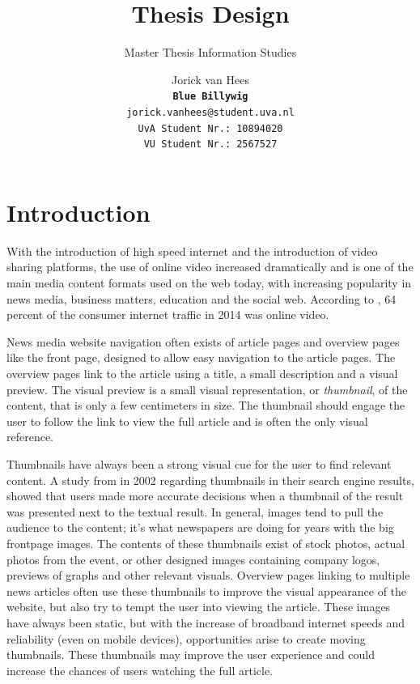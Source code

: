 \documentclass{../resources/acm_proc_article-sp}
\begin{document}
\title{Thesis Design}
\subtitle{Master Thesis Information Studies}

\author{
Jorick van Hees \\
\texttt{\textbf{Blue Billywig}} \\
\texttt{jorick.vanhees@student.uva.nl} \\
\texttt{UvA Student Nr.: 10894020} \\
\texttt{VU Student Nr.: 2567527}
}

\maketitle


\section{Introduction}

With the introduction of high speed internet and the introduction of video sharing platforms, the use of online video increased dramatically and is one of the main media content formats used on the web today, with increasing popularity in news media, business matters, education and the social web. According to \textcite{Cisco:2015wm}, 64 percent of the consumer internet traffic in 2014 was online video.

News media website navigation often exists of article pages and overview pages like the front page, designed to allow easy navigation to the article pages. The overview pages link to the article using a title, a small description and a visual preview. The visual preview is a small visual representation, or \textit{thumbnail}, of the content, that is only a few centimeters in size. The thumbnail should engage the user to follow the link to view the full article and is often the only visual reference.

Thumbnails have always been a strong visual cue for the user to find relevant content. A study from \textcite{Dziadosz:2002cl} in 2002 regarding thumbnails in their search engine results, showed that users made more accurate decisions when a thumbnail of the result was presented next to the textual result. In general, images tend to pull the audience to the content; it's what newspapers are doing for years with the big frontpage images. The contents of these thumbnails exist of stock photos, actual photos from the event, or other designed images containing company logos, previews of graphs and other relevant visuals. Overview pages linking to multiple news articles often use these thumbnails to improve the visual appearance of the website, but also try to tempt the user into viewing the article. These images have always been static, but with the increase of broadband internet speeds and reliability (even on mobile devices), opportunities arise to create moving thumbnails. These thumbnails may improve the user experience and could increase the chances of users watching the full article.
\end{document}
